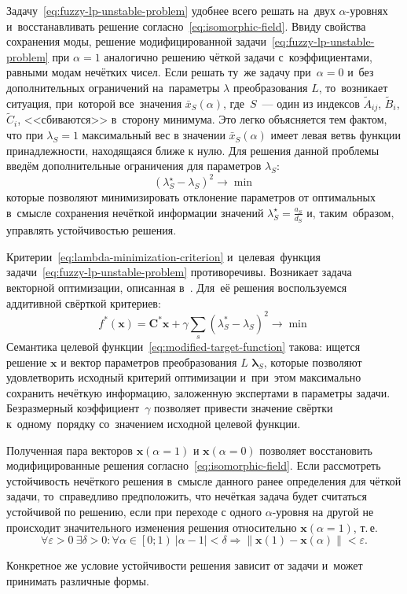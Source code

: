 Задачу~\eqref{eq:fuzzy-lp-unstable-problem} удобнее всего решать на~двух $\alpha$-уровнях и~восстанавливать решение согласно~\eqref{eq:isomorphic-field}. Ввиду свойства сохранения моды, решение модифицированной задачи~\eqref{eq:fuzzy-lp-unstable-problem} при $\alpha=1$ аналогично решению чёткой задачи с~коэффициентами, равными модам нечётких чисел. Если решать ту~же задачу при~$\alpha=0$ и~без дополнительных ограничений на~параметры $\lambda$ преобразования $L$, то~возникает ситуация, при~которой все~значения $\bar{x}_S\left(\alpha \right)$, где~$S$~--- один из индексов $\tilde A_{ij}$, $\tilde B_i$, $\tilde C_i$, <<сбиваются>> в~сторону минимума. Это легко объясняется тем фактом, что при $\lambda_S=1$ максимальный вес в значении $\bar{x}_S\left(\alpha \right)$ имеет левая ветвь функции принадлежности, находящаяся ближе к нулю. Для решения данной проблемы введём дополнительные ограничения для параметров $\lambda_S$:
\begin{equation}
\label{eq:lambda-minimization-criterion}
  {\left( \lambda_{S}^{\star}-\lambda_S \right)}^2\to \min
\end{equation}
которые позволяют минимизировать отклонение параметров от оптимальных в~смысле сохранения нечёткой информации значений $\displaystyle \lambda_{S}^{\star}=\frac{a_S}{d_S}$ и, таким~образом, управлять устойчивостью решения. 

Критерии~\eqref{eq:lambda-minimization-criterion} и~целевая~функция задачи~\eqref{eq:fuzzy-lp-unstable-problem} противоречивы. Возникает задача векторной оптимизации, описанная в~\cite{MSU_Optimization}. Для~её решения воспользуемся аддитивной свёрткой критериев:
\begin{equation}
\label{eq:modified-target-function}
  f^{*}\left( \mathbf{x} \right)=\mathbf{C}^{*}\mathbf{x}+\gamma \sum\limits_{s}^{}{\left(\lambda_{S}^{*}-\lambda_S \right)}^{2} \to \min
\end{equation}
Семантика целевой функции~\eqref{eq:modified-target-function} такова: ищется решение $\mathbf{x}$ и вектор параметров преобразования $L$ $\mathbf{\lambda}_S$, которые позволяют удовлетворить исходный критерий оптимизации и~при~этом максимально сохранить нечёткую информацию, заложенную экспертами в параметры задачи. Безразмерный коэффициент~$\gamma$ позволяет привести значение свёртки к~одному~порядку со~значением исходной целевой функции.

Полученная пара векторов $\mathbf{x}\left( \alpha =1 \right)$ и $\mathbf{x}\left( \alpha =0 \right)$ позволяет восстановить модифицированные решения согласно~\eqref{eq:isomorphic-field}. Если рассмотреть устойчивость нечёткого решения в~смысле данного ранее определения для чёткой задачи, то~справедливо предположить, что нечёткая задача будет считаться устойчивой по решению, если при переходе с одного $\alpha$-уровня на другой не происходит значительного изменения решения относительно $\mathbf{x}\left( \alpha =1 \right)$, т.\,е.
\begin{equation}
\label{eq:fuzzy-solution-stability}
  \forall \varepsilon >0\ \exists \delta >0:\forall \alpha \in \left[0; 1\right)\ \left| \alpha -1 \right|<\delta \Rightarrow \left\| \mathbf{x}\left( 1 \right)-\mathbf{x}\left( \alpha  \right) \right\|<\varepsilon.
\end{equation}

Конкретное же условие устойчивости решения зависит от задачи и~может принимать различные формы.